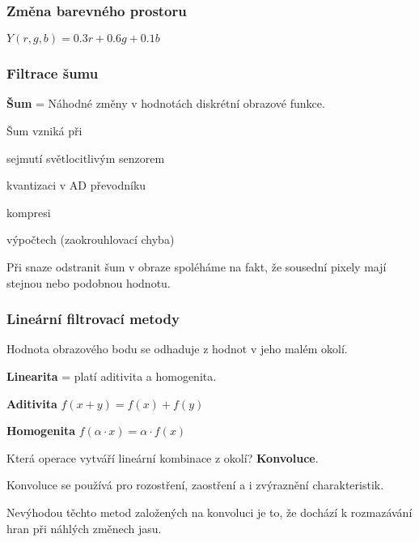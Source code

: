 \documentclass[FM]{tulpresentation}
\begin{document}
	\begin{frame}
		\frametitle{Změna barevného prostoru}
		\begin{items}
			\item $Y(r,g,b) = 0.3r + 0.6g + 0.1b$
		\end{items}
	\end{frame}
	
	\begin{frame}
		\frametitle{Filtrace šumu}
		\begin{items}
			\item \textbf{Šum} = Náhodné změny v hodnotách diskrétní obrazové funkce.
			\item Šum vzniká při
			\begin{items}
				\item sejmutí světlocitlivým senzorem
				\item kvantizaci v AD převodníku
				\item kompresi
				\item výpočtech (zaokrouhlovací chyba)
			\end{items}
			\item Při snaze odstranit šum v obraze spoléháme na fakt, že sousední pixely mají stejnou nebo podobnou hodnotu.
		\end{items}
	\end{frame}
	
	\begin{frame}
		\frametitle{Lineární filtrovací metody}
		\begin{items}
			\item Hodnota obrazového bodu se odhaduje z hodnot v jeho malém okolí.
			\item \textbf{Linearita} = platí aditivita a homogenita.
			\begin{items}
				\item \textbf{Aditivita} $f(x + y) = f(x) + f(y)$
				\item \textbf{Homogenita} $f(\alpha \cdot x) = \alpha \cdot f(x)$
			\end{items}
			\item Která operace vytváří lineární kombinace z okolí? \textbf{Konvoluce}.
			\item Konvoluce se používá pro rozostření, zaostření a i zvýraznění charakteristik.
			\item Nevýhodou těchto metod založených na 			konvoluci je to, že dochází k rozmazávání hran při náhlých změnech jasu.
		\end{items}
	\end{frame}
  
\end{document}
